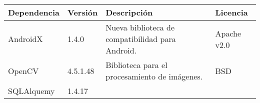 \begin{longtable}[]{@{}llll@{}} 
\toprule 
\begin{minipage}[b]{0.18\columnwidth}\raggedright\strut
Dependencia\strut
\end{minipage} & \begin{minipage}[b]{0.10\columnwidth}\raggedright\strut
Versión\strut
\end{minipage} & \begin{minipage}[b]{0.49\columnwidth}\raggedright\strut
Descripción\strut
\end{minipage} & \begin{minipage}[b]{0.11\columnwidth}\raggedright\strut
Licencia\strut
\end{minipage}\tabularnewline
\midrule
\endhead
\begin{minipage}[t]{0.18\columnwidth}\raggedright\strut
AndroidX\strut
\end{minipage} & \begin{minipage}[t]{0.08\columnwidth}\raggedright\strut
1.4.0\strut
\end{minipage} & \begin{minipage}[t]{0.49\columnwidth}\raggedright\strut
Nueva biblioteca de compatibilidad para Android.\strut
\end{minipage} & \begin{minipage}[t]{0.11\columnwidth}\raggedright\strut
Apache v2.0\strut
\end{minipage}\tabularnewline
\begin{minipage}[t]{0.18\columnwidth}\raggedright\strut
OpenCV\strut
\end{minipage} & \begin{minipage}[t]{0.08\columnwidth}\raggedright\strut
4.5.1.48\strut
\end{minipage} & \begin{minipage}[t]{0.49\columnwidth}\raggedright\strut
Biblioteca para el procesamiento de imágenes.\strut
\end{minipage} & \begin{minipage}[t]{0.11\columnwidth}\raggedright\strut
BSD\strut
\end{minipage}\tabularnewline
\begin{minipage}[t]{0.18\columnwidth}\raggedright\strut
SQLAlquemy\strut
\end{minipage} & \begin{minipage}[t]{0.08\columnwidth}\raggedright\strut
1.4.17\strut
\end{minipage} & \begin{minipage}[t]{0.49\columnwidth}\raggedright\strut

\end{minipage}
\end{longtable}
